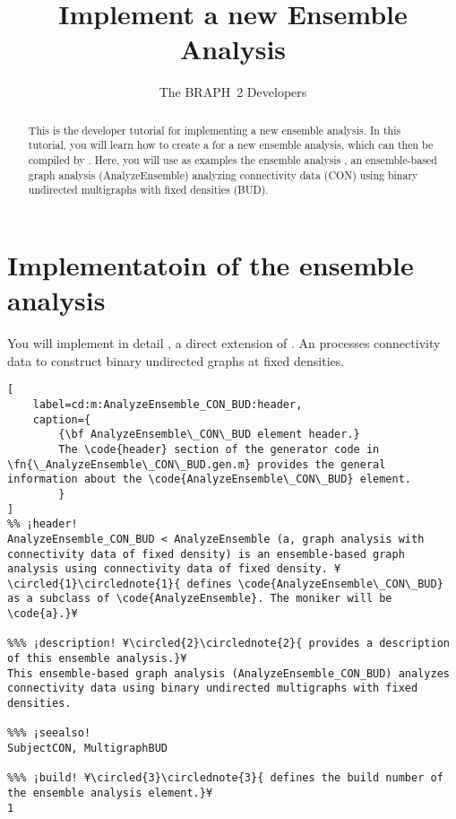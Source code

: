 \documentclass{tufte-handout}
\title{Implement a new Ensemble Analysis}
\author[The BRAPH~2 Developers]{The BRAPH~2 Developers}
\begin{document}
\maketitle

\begin{abstract}
\noindent
This is the developer tutorial for implementing a new ensemble analysis. 
In this tutorial, you will learn how to create a  for a new ensemble analysis, which can then be compiled by .
Here, you will use as examples the ensemble analysis , an ensemble-based graph analysis (AnalyzeEnsemble) analyzing connectivity data (CON) using binary undirected multigraphs with fixed densities (BUD).
\end{abstract}

\tableofcontents

\clearpage

\section{Implementatoin of the ensemble analysis}

You will implement in detail , a direct extension of .
An  processes connectivity data to construct binary undirected graphs at fixed densities.

\begin{lstlisting}[
	label=cd:m:AnalyzeEnsemble_CON_BUD:header,
	caption={
		{\bf AnalyzeEnsemble\_CON\_BUD element header.}
		The \code{header} section of the generator code in \fn{\_AnalyzeEnsemble\_CON\_BUD.gen.m} provides the general information about the \code{AnalyzeEnsemble\_CON\_BUD} element.
		}
]
%% ¡header!
AnalyzeEnsemble_CON_BUD < AnalyzeEnsemble (a, graph analysis with connectivity data of fixed density) is an ensemble-based graph analysis using connectivity data of fixed density. ¥\circled{1}\circlednote{1}{ defines \code{AnalyzeEnsemble\_CON\_BUD} as a subclass of \code{AnalyzeEnsemble}. The moniker will be \code{a}.}¥

%%% ¡description! ¥\circled{2}\circlednote{2}{ provides a description of this ensemble analysis.}¥
This ensemble-based graph analysis (AnalyzeEnsemble_CON_BUD) analyzes 
connectivity data using binary undirected multigraphs with fixed densities.

%%% ¡seealso!
SubjectCON, MultigraphBUD

%%% ¡build! ¥\circled{3}\circlednote{3}{ defines the build number of the ensemble analysis element.}¥
1
\end{lstlisting}
\end{document}
